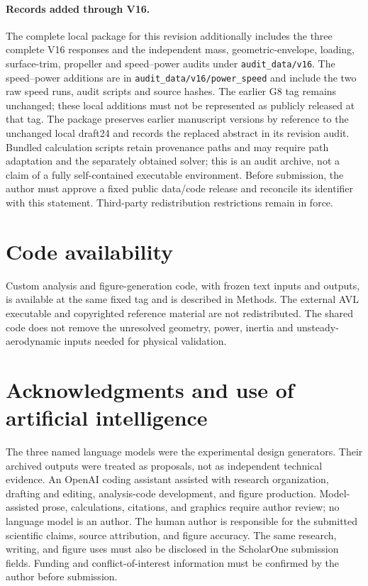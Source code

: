 \documentclass[11pt,a4paper]{article}
\begin{document}
\paragraph{Records added through V16.}
The complete local package for this revision additionally includes the three
complete V16 responses and the independent mass, geometric-envelope, loading,
surface-trim, propeller and speed--power audits under \texttt{audit\_data/v16}.
The speed--power additions are in \texttt{audit\_data/v16/power\_speed} and include
the two raw speed runs, audit scripts and source hashes. The earlier G8 tag remains
unchanged; these local additions must not be represented as publicly released at
that tag. The package preserves earlier manuscript versions by reference to the
unchanged local draft24 and records the replaced abstract in its revision audit.
Bundled calculation scripts retain provenance paths and may require path adaptation
and the separately obtained solver; this is an audit archive, not a claim of a
fully self-contained executable environment. Before submission, the author must
approve a fixed public data/code release and reconcile its identifier with this
statement. Third-party redistribution restrictions remain in force.

\section*{Code availability}
Custom analysis and figure-generation code, with frozen text inputs and outputs, is available at the same fixed tag and is described in Methods. The external AVL executable and copyrighted reference material are not redistributed. The shared code does not remove the unresolved geometry, power, inertia and unsteady-aerodynamic inputs needed for physical validation.

\section*{Acknowledgments and use of artificial intelligence}
The three named language models were the experimental design generators. Their
archived outputs were treated as proposals, not as independent technical
evidence. An OpenAI coding assistant assisted with research organization,
drafting and editing, analysis-code development, and figure production.
Model-assisted prose, calculations, citations, and graphics require author
review; no language model is an author. The human author is responsible for
the submitted scientific claims, source attribution, and figure accuracy.
The same research, writing, and figure uses must also be disclosed in the
ScholarOne submission fields. Funding and conflict-of-interest information
must be confirmed by the author before submission.
\end{document}
